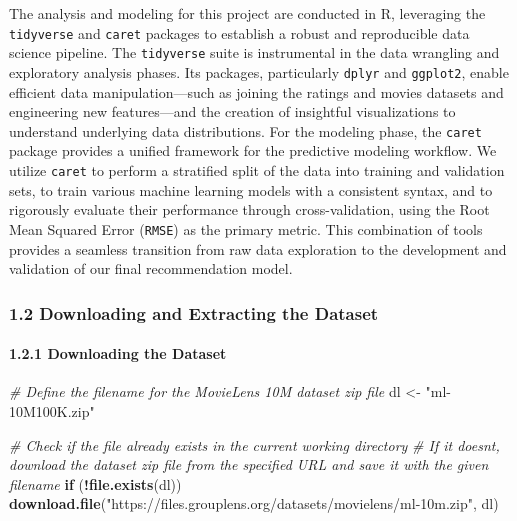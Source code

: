 \documentclass[
]{article}
\newenvironment{Shaded}{\begin{snugshade}}{\end{snugshade}}
\newcommand{\CommentTok}[1]{\textcolor[rgb]{0.56,0.35,0.01}{\textit{#1}}}
\newcommand{\ControlFlowTok}[1]{\textcolor[rgb]{0.13,0.29,0.53}{\textbf{#1}}}
\newcommand{\FunctionTok}[1]{\textcolor[rgb]{0.13,0.29,0.53}{\textbf{#1}}}
\newcommand{\NormalTok}[1]{#1}
\newcommand{\OtherTok}[1]{\textcolor[rgb]{0.56,0.35,0.01}{#1}}
\newcommand{\SpecialCharTok}[1]{\textcolor[rgb]{0.81,0.36,0.00}{\textbf{#1}}}
\newcommand{\StringTok}[1]{\textcolor[rgb]{0.31,0.60,0.02}{#1}}
\begin{document}
The analysis and modeling for this project are conducted in R,
leveraging the \texttt{tidyverse} and \texttt{caret} packages to
establish a robust and reproducible data science pipeline. The
\texttt{tidyverse} suite is instrumental in the data wrangling and
exploratory analysis phases. Its packages, particularly \texttt{dplyr}
and \texttt{ggplot2}, enable efficient data manipulation---such as
joining the ratings and movies datasets and engineering new
features---and the creation of insightful visualizations to understand
underlying data distributions. For the modeling phase, the
\texttt{caret} package provides a unified framework for the predictive
modeling workflow. We utilize \texttt{caret} to perform a stratified
split of the data into training and validation sets, to train various
machine learning models with a consistent syntax, and to rigorously
evaluate their performance through cross-validation, using the Root Mean
Squared Error (\texttt{RMSE}) as the primary metric. This combination of
tools provides a seamless transition from raw data exploration to the
development and validation of our final recommendation model. \newpage

\subsubsection{1.2 Downloading and Extracting the
Dataset}\label{downloading-and-extracting-the-dataset}

\paragraph{1.2.1 Downloading the Dataset}\label{downloading-the-dataset}

\begin{Shaded}
\begin{Highlighting}[]
\CommentTok{\# Define the filename for the MovieLens 10M dataset zip file}
\NormalTok{dl }\OtherTok{\textless{}{-}} \StringTok{"ml{-}10M100K.zip"}

\CommentTok{\# Check if the file already exists in the current working directory}
\CommentTok{\# If it doesn\textquotesingle{}t, download the dataset zip file from the specified URL and save it with the given filename}
\ControlFlowTok{if}\NormalTok{ (}\SpecialCharTok{!}\FunctionTok{file.exists}\NormalTok{(dl))}
  \FunctionTok{download.file}\NormalTok{(}\StringTok{"https://files.grouplens.org/datasets/movielens/ml{-}10m.zip"}\NormalTok{, dl)}
\end{Highlighting}
\end{Shaded}
\end{document}
